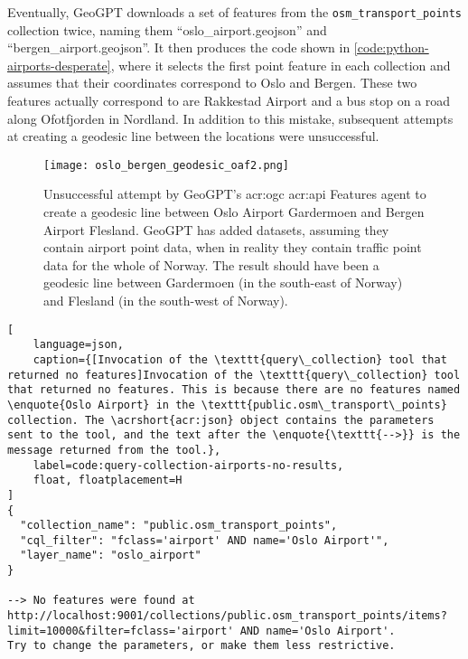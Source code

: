 Eventually, GeoGPT downloads a set of features from the \texttt{osm\_transport\_points} collection twice, naming them \enquote{oslo\_airport.geojson} and \enquote{bergen\_airport.geojson}. It then produces the code shown in \autoref{code:python-airports-desperate}, where it selects the first point feature in each collection and assumes that their coordinates correspond to Oslo and Bergen. These two features actually correspond to are Rakkestad Airport and a bus stop on a road along Ofotfjorden in Nordland. In addition to this mistake, subsequent attempts at creating a geodesic line between the locations were unsuccessful.

\begin{figure}[htbp]
    \centering
    \texttt{[image: oslo\_bergen\_geodesic\_oaf2.png]}
    \caption[Unsuccessful attempt by GeoGPT's OGC API Features agent to create a geodesic line between Oslo Airport Gardermoen and Bergen Airport Flesland]{Unsuccessful attempt by GeoGPT's \acrshort{acr:ogc} \acrshort{acr:api} Features agent to create a geodesic line between Oslo Airport Gardermoen and Bergen Airport Flesland. GeoGPT has added datasets, assuming they contain airport point data, when in reality they contain traffic point data for the whole of Norway. The result should have been a geodesic line between Gardermoen (in the south-east of Norway) and Flesland (in the south-west of Norway).}
    \label{fig:oaf-geodesic-unsuccessful}
\end{figure}

\FloatBarrier

\begin{lstlisting}[
    language=json,
    caption={[Invocation of the \texttt{query\_collection} tool that returned no features]Invocation of the \texttt{query\_collection} tool that returned no features. This is because there are no features named \enquote{Oslo Airport} in the \texttt{public.osm\_transport\_points} collection. The \acrshort{acr:json} object contains the parameters sent to the tool, and the text after the \enquote{\texttt{-->}} is the message returned from the tool.},
    label=code:query-collection-airports-no-results,
    float, floatplacement=H
]
{
  "collection_name": "public.osm_transport_points",
  "cql_filter": "fclass='airport' AND name='Oslo Airport'",
  "layer_name": "oslo_airport"
}

--> No features were found at http://localhost:9001/collections/public.osm_transport_points/items?limit=10000&filter=fclass='airport' AND name='Oslo Airport'.
Try to change the parameters, or make them less restrictive.
\end{lstlisting}

